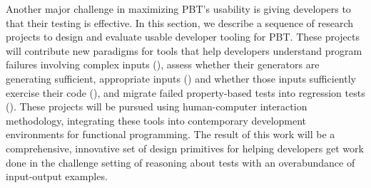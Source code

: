 



Another major challenge in maximizing PBT's usability is giving developers to
 that their testing is effective.  In this section, we
describe a sequence of research projects to design and evaluate usable developer
tooling for PBT. These projects will contribute new paradigms
for tools that help developers understand program failures involving complex
inputs (), assess whether their generators are
generating sufficient, appropriate inputs
() and whether those inputs
sufficiently exercise their code (), and migrate failed
property-based tests into regression tests ().  These
projects will be pursued using human-computer interaction methodology,
integrating these tools into contemporary development environments for
functional programming. The result of this work will be a comprehensive,
innovative set of design primitives for helping developers get work done in the
challenge setting of reasoning about tests with an overabundance of input-output
examples.

